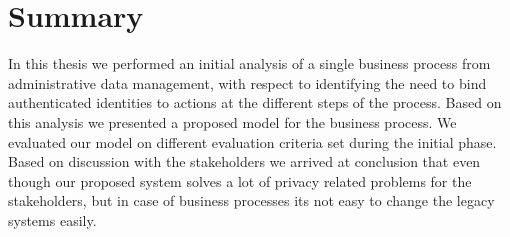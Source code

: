 \chapter{Summary}

In this thesis we performed an initial analysis of a single business process from administrative data management, with respect to identifying the need to bind authenticated identities to actions at the different steps of the process. Based on this analysis we presented a proposed model for the business process. We evaluated our model on different evaluation criteria set during the initial phase. Based on discussion with the stakeholders we arrived at conclusion that even though our proposed system solves a lot of privacy related problems for the stakeholders, but in case of business processes its not easy to change the legacy systems easily.